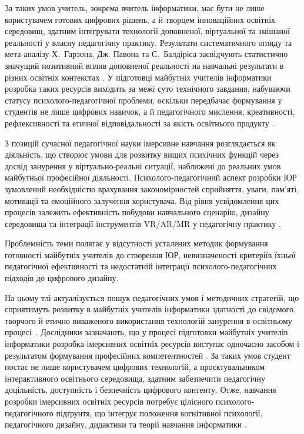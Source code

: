 За таких умов учитель, зокрема вчитель інформатики, має бути не лише користувачем готових цифрових рішень, а й творцем інноваційних освітніх середовищ, здатним інтегрувати технології доповненої, віртуальної та змішаної реальності у власну педагогічну практику. Результати систематичного огляду та мета-аналізу Х.~Гарзона, Дж. Павона та С.~Балдіріса засвідчують статистично значущий позитивний вплив доповненої реальності на навчальні результати в різних освітніх контекстах \cite{Akdeniz2023AR}. У підготовці майбутніх учителів інформатики розробка таких ресурсів виходить за межі суто технічного завдання, набуваючи статусу психолого-педагогічної проблеми, оскільки передбачає формування у студентів не лише цифрових навичок, а й педагогічного мислення, креативності, рефлексивності та етичної відповідальності за якість освітнього продукту \cite{Kerr2020Augmented}.

З позицій сучасної педагогічної науки імерсивне навчання розглядається як діяльність, що створює умови для розвитку вищих психічних функцій через досвід занурення у віртуально-реальні ситуації, наближені до реальних умов майбутньої професійної діяльності. Психолого-педагогічний аспект розробки ІОР зумовлений необхідністю врахування закономірностей сприйняття, уваги, пам'яті, мотивації та емоційного залучення користувача. Від рівня усвідомлення цих процесів залежить ефективність побудови навчального сценарію, дизайну середовища та інтеграції інструментів VR/AR/MR у педагогічну практику \cite{Radianti2020VR}.

Проблемність теми полягає у відсутності усталених методик формування готовності майбутніх учителів до створення ІОР, невизначеності критеріїв їхньої педагогічної ефективності та недостатній інтеграції психолого-педагогічних підходів до цифрового дизайну.

На цьому тлі актуалізується пошук педагогічних умов і методичних стратегій, що сприятимуть розвитку в майбутніх учителів інформатики здатності до свідомого, творчого й етично виваженого використання технологій занурення в освітньому процесі~\cite{Goncharenko2011Pedagogy}. Дослідники зазначають, що у процесі підготовки майбутніх учителів інформатики розробка імерсивних освітніх ресурсів виступає одночасно засобом і результатом формування професійних компетентностей \cite{Alalwan2020VR}. За таких умов студент постає не лише користувачем цифрових технологій, а проєктувальником інтерактивного освітнього середовища, здатним забезпечити педагогічну доцільність, доступність і безпечність цифрового контенту. Отже, навчання розробки імерсивних освітніх ресурсів потребує цілісного психолого-педагогічного підґрунтя, що інтегрує положення когнітивної психології, педагогічного дизайну, дидактики та теорії навчання інформатики \cite{Dalgarno2010What}.

